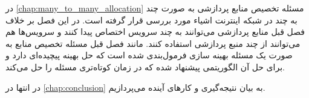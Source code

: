     در \cref{chap:many_to_many_allocation} مسئله تخصیص منابع پردازشی به صورت چند به چند در شبکه اینترنت اشیاء مورد بررسی قرار گرفته است.
    در این فصل بر خلاف فصل قبل منابع پردازشی می‌توانند به چند سرویس اختصاص پیدا کنند و سرویس‌ها هم می‌توانند از چند منبع پردازشی استفاده کنند.
    مانند فصل قبل مسئله تخصیص منابع به صورت یک مسئله بهینه سازی فرمول‌بندی شده است که حل بهینه پیچیده‌ای دارد و برای حل آن الگوریتمی پیشنهاد شده که در زمان کوتاه‌تری مسئله را حل می‌کند.

    در انتها در \cref{chap:conclusion} به بیان نتیجه‌گیری و کار‌های آینده می‌پردازیم.
